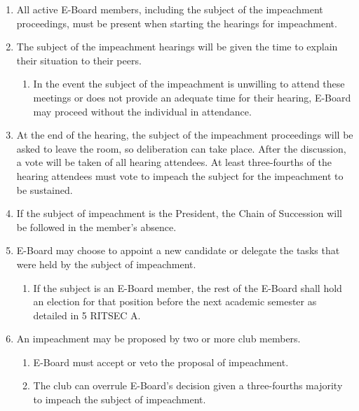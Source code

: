 


\begin{enumerate}
  \item All active E-Board members, including the subject of the impeachment
    proceedings, must be present when starting the hearings for impeachment.
  \item The subject of the impeachment hearings will be given the time to
    explain their situation to their peers.
  \begin{enumerate}
    \item In the event the subject of the impeachment is unwilling to attend
      these meetings or does not provide an adequate time for their hearing,
      E-Board may proceed without the individual in attendance.
  \end{enumerate}
  \item At the end of the hearing, the subject of the impeachment proceedings
    will be asked to leave the room, so deliberation can take place. After the
    discussion, a vote will be taken of all hearing attendees. At least
    three-fourths of the hearing attendees must vote to impeach the subject for
    the impeachment to be sustained.
  \item If the subject of impeachment is the President, the Chain of Succession
    will be followed in the member’s absence.
  \item E-Board may choose to appoint a new candidate or delegate the tasks
    that were held by the subject of impeachment.
  \begin{enumerate}
    \item If the subject is an E-Board member, the rest of the E-Board shall
      hold an election for that position before the next academic semester as
      detailed in 5 RITSEC A.
  \end{enumerate}
  \item An impeachment may be proposed by two or more club members.
  \begin{enumerate}
    \item E-Board must accept or veto the proposal of impeachment.
    \item The club can overrule E-Board's decision given a three-fourths
      majority to impeach the subject of impeachment.
  \end{enumerate}
\end{enumerate}

